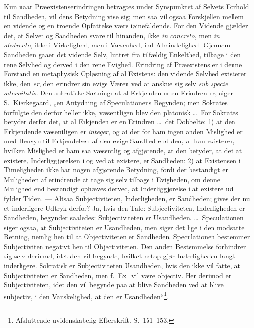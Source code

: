 \documentclass[12pt]{book}
\begin{document}
Kun naar Præexistenserindringen betragtes under Synspunktet af
Selvets Forhold til Sandheden, vil dens
Betydning vise sig; men saa vil ogsaa Forskjellen mellem en vidende
og en troende Opfattelse være iøinefaldende. For den Vidende gjælder
det, at Selvet og Sandheden svare til hinanden, ikke \textit{in
concreto}, men \textit{in abstracto}, ikke i Virkelighed, men i
Væsenhed, i al Almindelighed. Gjennem Sandheden gaaer det vidende
Selv, luttret fra tilfældig Enkelthed, tilbage i den rene Selvhed og
derved i den rene Evighed. Erindring af Præexistens er i denne
Forstand en metaphysisk Opløsning af al Existens: den vidende Selvhed
existerer ikke, den \emph{er}, den erindrer sin evige Væren ved at
anskue sig selv \textit{sub specie æternitatis}. Den sokratiske
Sætning: at al Erkjenden er en Erindren er, siger S.\ Kierkegaard,
„en Antydning af Speculationens Begynden; men Sokrates forfulgte den
derfor heller ikke, væsentligen blev den platonisk \dots\ For
Sokrates betyder derfor det, at al Erkjenden er en Erindren \dots\ det
Dobbelte: 1) at den Erkjendende væsentligen er \textit{integer}, og
at der for ham ingen anden Mislighed er med Hensyn til Erkjendelsen
af den evige Sandhed end den, at han existerer, hvilken Mislighed er
ham saa væsentlig og afgjørende, at den betyder, at det at existere,
Inderliggjørelsen i og ved at existere, er Sandheden; 2) at
Existensen i Timeligheden ikke har nogen afgjørende Betydning, fordi
der bestandigt er Muligheden af erindrende at tage sig selv tilbage i
Evigheden, om denne Mulighed end bestandigt ophæves derved, at
Inderliggjørelse i at existere ud\-
fylder Tiden. --- Altsaa Subjectiviteten, Inderligheden, er
Sandheden; gives der nu et inderligere Udtryk derfor? Ja, hvis den
Tale: Subjectiviteten, Inderligheden er Sandheden, begynder saaledes:
Subjectiviteten er Usandheden. \dots\ Speculationen siger ogsaa, at
Subjectiviteten er Usandheden, men siger det lige i den modsatte
Retning, nemlig hen til at Objectiviteten er Sandheden. Speculationen
bestemmer Subjectiviten negativt hen til Objectiviteten.
Den anden Bestemmelse forhindrer sig selv derimod, idet den vil
begynde, hvilket netop gjør Inderligheden langt inderligere. Sokratisk
er Subjectiviteten Usandheden, hvis den ikke vil fatte, at
Subjectiviteten er Sandheden, men f.\ Ex.\ vil være objectiv. Her
derimod er Subjectiviteten, idet den vil begynde paa at blive
Sandheden ved at blive subjectiv, i den Vanskelighed, at den er
Usandheden“\footnote{Afsluttende uvidenskabelig Efterskrift.
S.\ 151--153.}.
\end{document}
